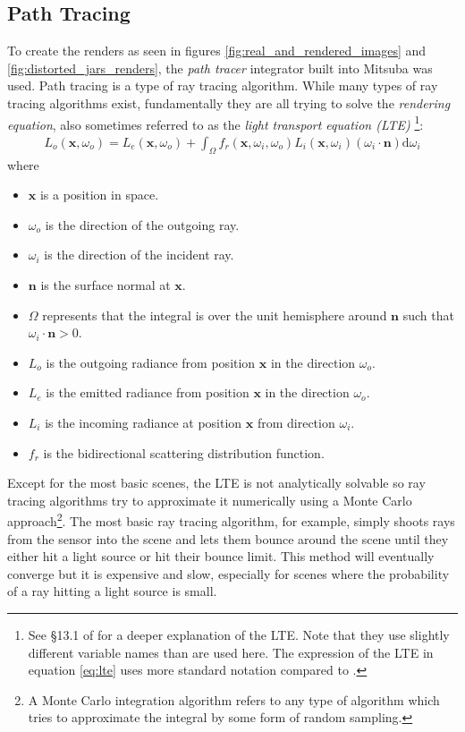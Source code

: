 \documentclass[11pt, letterpaper]{extarticle} %
\begin{document}
\subsection{Path Tracing}\label{subsec:path_tracing}
To create the renders as seen in figures \ref{fig:real_and_rendered_images} and \ref{fig:distorted_jars_renders}, the \textit{path tracer} integrator built into Mitsuba was used. Path tracing is a type of ray tracing algorithm. While many types of ray tracing algorithms exist, fundamentally they are all trying to solve the \textit{rendering equation}, also sometimes referred to as the \textit{light transport equation (LTE)} \cite{pharr2023physically}\footnote{See \S13.1 of \cite{pharr2023physically} for a deeper explanation of the LTE. Note that they use slightly different variable names than are used here. The expression of the LTE in equation \ref{eq:lte} uses more standard notation compared to \cite{pharr2023physically}.}:
\begin{align}\label{eq:lte}
    L_o(\mathbf{x}, \omega_o) = L_e(\mathbf{x}, \omega_o) + \int_\Omega f_r(\mathbf{x}, \omega_i, \omega_o) L_i(\mathbf{x}, \omega_i) (\omega_i \cdot \mathbf{n}) \mathrm{d} \omega_i
\end{align}
where
\begin{itemize}
    \item $\mathbf{x}$ is a position in space.
    \item $\omega_o$ is the direction of the outgoing ray.
    \item $\omega_i$ is the direction of the incident ray.
    \item $\mathbf{n}$ is the surface normal at $\mathbf{x}$.
    \item $\Omega$ represents that the integral is over the unit hemisphere around $\mathbf{n}$ such that $\omega_i \cdot \mathbf{n} > 0$.
    \item $L_o$ is the outgoing radiance from position $\mathbf{x}$ in the direction $\omega_o$.
    \item $L_e$ is the emitted radiance from position $\mathbf{x}$ in the direction $\omega_o$.
    \item $L_i$ is the incoming radiance at position $\mathbf{x}$ from direction $\omega_i$.
    \item $f_r$ is the bidirectional scattering distribution function.
\end{itemize}
Except for the most basic scenes, the LTE is not analytically solvable so ray tracing algorithms try to approximate it numerically using a Monte Carlo approach\footnote{A Monte Carlo integration algorithm refers to any type of algorithm which tries to approximate the integral by some form of random sampling.}. The most basic ray tracing algorithm, for example, simply shoots rays from the sensor into the scene and lets them bounce around the scene until they either hit a light source or hit their bounce limit. This method will eventually converge but it is expensive and slow, especially for scenes where the probability of a ray hitting a light source is small. 
\end{document}
